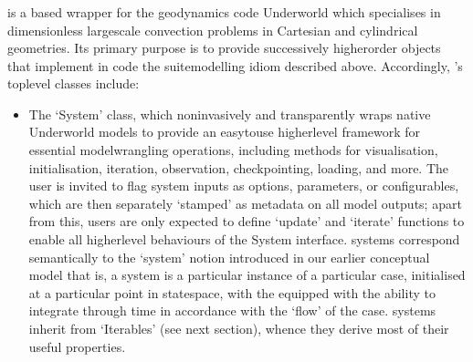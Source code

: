 \documentclass[letterpaper,10pt,english]{jupyterBook}
\begin{document}
\subsubsection{}
\label{\detokenize{content/chapter_02_methods/section3:planetengine}}
\sphinxAtStartPar
{} is a \sphinxhyphen{}based wrapper for the geodynamics code Underworld which specialises in dimensionless large\sphinxhyphen{}scale convection problems in Cartesian and cylindrical geometries. Its primary purpose is to provide successively higher\sphinxhyphen{}order objects that implement in code the suite\sphinxhyphen{}modelling idiom described above. Accordingly, ’s top\sphinxhyphen{}level classes include:
\begin{itemize}
\item {} 
\sphinxAtStartPar
The ‘System’ class, which non\sphinxhyphen{}invasively and transparently wraps native Underworld models to provide an easy\sphinxhyphen{}to\sphinxhyphen{}use higher\sphinxhyphen{}level framework for essential model\sphinxhyphen{}wrangling operations, including methods for visualisation, initialisation, iteration, observation, checkpointing, loading, and more. The user is invited to flag system inputs as options, parameters, or configurables, which are then separately ‘stamped’ as metadata on all model outputs; apart from this, users are only expected to define ‘update’ and ‘iterate’ functions to enable all higher\sphinxhyphen{}level behaviours of the System interface.  systems correspond semantically to the ‘system’ notion introduced in our earlier conceptual model \sphinxhyphen{} that is, a system is a particular instance of a particular case, initialised at a particular point in state\sphinxhyphen{}space, with the equipped with the ability to integrate through time in accordance with the ‘flow’ of the case.  systems inherit from  ‘Iterables’ (see next section), whence they derive most of their useful properties.


\end{itemize}
\end{document}
